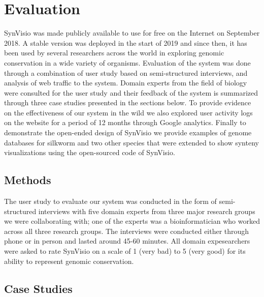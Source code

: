 \chapter{Evaluation}

SynVisio was made publicly available to use for free on the Internet on September 2018. A stable version was deployed in the start of 2019 and since then, it has been used by several researchers across the world in exploring genomic conservation in a wide variety of organisms. Evaluation of the system was done through a combination of user study based on semi-structured interviews, and analysis of web traffic to the system. Domain experts from the field of biology were consulted for the user study and their feedback of the system is summarized through three case studies presented in the sections below. To provide evidence on the effectiveness of our system in the wild we also explored user activity logs on the website for a period of 12 months through Google analytics. Finally to demonstrate the open-ended design of SynVisio we provide examples of genome databases for silkworm and two other species that were extended to show synteny visualizations using the open-sourced code of SynVisio.

\section{Methods}
The user study to evaluate our system was conducted in the form of semi-structured interviews with five domain experts from three major research groups we were collaborating with; one of the experts was a bioinformatician who worked across all three research groups. The interviews were conducted either through phone or in person and lasted around 45-60 minutes. All domain expesearchers were asked to rate SynVisio on a scale of 1 (very bad) to 5 (very good) for its ability to represent genomic conservation.


\section{Case Studies}

